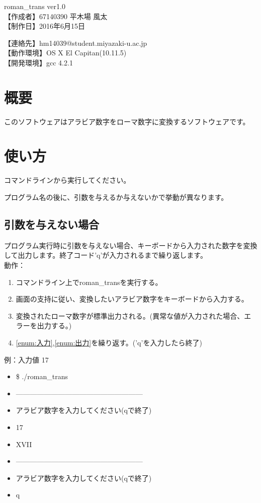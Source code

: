 \documentclass{jsarticle}
\begin{document}
\noindent
{\Huge roman\_trans ver1.0}\\ 
{\large【作成者】67140390 平木場 風太}\\
{\large【制作日】2016年6月15日}\\
{\large【連絡先】hm14039@student.miyazaki-u.ac.jp\\
{\large【動作環境】OS X El Capitan(10.11.5)}\\
{\large【開発環境】gcc 4.2.1}\\


\section{概要}
このソフトウェアはアラビア数字をローマ数字に変換するソフトウェアです。
\\

\section{使い方}
コマンドラインから実行してください。

プログラム名の後に、引数を与えるか与えないかで挙動が異なります。

\subsection{引数を与えない場合}
プログラム実行時に引数を与えない場合、キーボードから入力された数字を変換して出力します。終了コード'q'が入力されるまで繰り返します。\\


動作：
\begin{enumerate}
  \item コマンドライン上でroman\_transを実行する。
  \item 画面の支持に従い、変換したいアラビア数字をキーボードから入力する。 \label{enum:入力}
  \item 変換されたローマ数字が標準出力される。(異常な値が入力された場合、エラーを出力する。) 
  	\label{enum:出力}
  \item \ref{enum:入力},\ref{enum:出力}を繰り返す。('q'を入力したら終了)\\
\end{enumerate}

例：入力値 17
\begin{itemize}
\item[] \$ ./roman\_trans
\item[] ------------------------------------------------------
\item[] アラビア数字を入力してください(qで終了)
\item[] 17
\item[] XVII
\item[] ------------------------------------------------------
\item[] アラビア数字を入力してください(qで終了)
\item[] q
\end{itemize}

}
\end{document}
